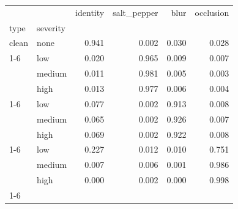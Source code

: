 \begin{tabular}{llrrrr}
\toprule
 &  & identity & salt_pepper & blur & occlusion \\
type & severity &  &  &  &  \\
\midrule
clean & none & 0.941 & 0.002 & 0.030 & 0.028 \\
\cline{1-6}
\multirow[t]{3}{*}{salt_pepper} & low & 0.020 & 0.965 & 0.009 & 0.007 \\
 & medium & 0.011 & 0.981 & 0.005 & 0.003 \\
 & high & 0.013 & 0.977 & 0.006 & 0.004 \\
\cline{1-6}
\multirow[t]{3}{*}{blur} & low & 0.077 & 0.002 & 0.913 & 0.008 \\
 & medium & 0.065 & 0.002 & 0.926 & 0.007 \\
 & high & 0.069 & 0.002 & 0.922 & 0.008 \\
\cline{1-6}
\multirow[t]{3}{*}{occlusion} & low & 0.227 & 0.012 & 0.010 & 0.751 \\
 & medium & 0.007 & 0.006 & 0.001 & 0.986 \\
 & high & 0.000 & 0.002 & 0.000 & 0.998 \\
\cline{1-6}
\bottomrule
\end{tabular}
